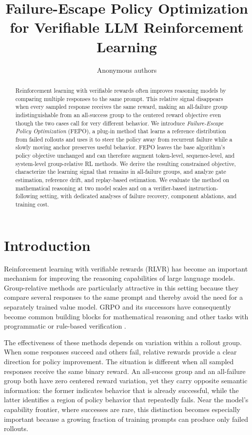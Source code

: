 \documentclass{article}
\title{Failure-Escape Policy Optimization for Verifiable LLM Reinforcement Learning}
\author{Anonymous authors}
\newcommand{\FEPO}{\textsc{FEPO}\xspace}
\begin{document}
\maketitle

\begin{abstract}
Reinforcement learning with verifiable rewards often improves reasoning models by comparing multiple responses to the same prompt. This relative signal disappears when every sampled response receives the same reward, making an all-failure group indistinguishable from an all-success group to the centered reward objective even though the two cases call for very different behavior. We introduce \emph{Failure-Escape Policy Optimization} (\FEPO), a plug-in method that learns a reference distribution from failed rollouts and uses it to steer the policy away from recurrent failure while a slowly moving anchor preserves useful behavior. \FEPO leaves the base algorithm's policy objective unchanged and can therefore augment token-level, sequence-level, and system-level group-relative RL methods. We derive the resulting constrained objective, characterize the learning signal that remains in all-failure groups, and analyze gate estimation, reference drift, and replay-based estimation. We evaluate the method on mathematical reasoning at two model scales and on a verifier-based instruction-following setting, with dedicated analyses of failure recovery, component ablations, and training cost.
\end{abstract}

\section{Introduction}

Reinforcement learning with verifiable rewards (RLVR) has become an important mechanism for improving the reasoning capabilities of large language models. Group-relative methods are particularly attractive in this setting because they compare several responses to the same prompt and thereby avoid the need for a separately trained value model. GRPO and its successors have consequently become common building blocks for mathematical reasoning and other tasks with programmatic or rule-based verification \citep{deepseekmath2024,liu2025understanding,yu2025dapo,zheng2025gspo}.

The effectiveness of these methods depends on variation within a rollout group. When some responses succeed and others fail, relative rewards provide a clear direction for policy improvement. The situation is different when all sampled responses receive the same binary reward. An all-success group and an all-failure group both have zero centered reward variation, yet they carry opposite semantic information: the former indicates behavior that is already successful, while the latter identifies a region of policy behavior that repeatedly fails. Near the model's capability frontier, where successes are rare, this distinction becomes especially important because a growing fraction of training prompts can produce only failed rollouts.
\end{document}
